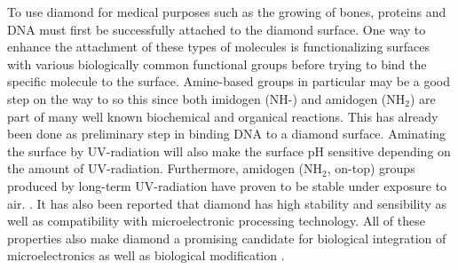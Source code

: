 \documentclass[12pt,a4paper]{article}
\begin{document}
To use diamond for medical purposes such as the growing of bones, proteins and DNA must first be successfully attached to the diamond surface. One way to enhance the attachment of these types of molecules is functionalizing surfaces with various biologically common functional groups before trying to bind the specific molecule to the surface. Amine-based groups in particular may be a good step on the way to so this since both imidogen (NH-) and amidogen (NH$_2$) are part of many well known biochemical and organical reactions. This has already been done as preliminary step in binding DNA to a diamond surface. Aminating the surface by UV-radiation will also make the surface pH sensitive depending on the amount of UV-radiation. Furthermore, amidogen (NH$_2$, on-top) groups produced by long-term UV-radiation have proven to be stable under exposure to air. \cite{kwang-soup.song2006}. It has also been reported that diamond has high stability and sensibility as well as compatibility with microelectronic processing technology. All of these properties also make diamond a promising candidate for  biological integration of microelectronics as well as biological modification \cite{yangwenshaw2002}. 

\end{document}
